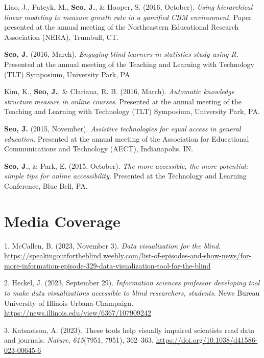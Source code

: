 \documentclass[11pt,a4paper,]{awesome-cv}
\newlength{\cslhangindent}
\newenvironment{CSLReferences}[2] %
 {\begin{list}{}{%
  \setlength{\itemindent}{0pt}
  \setlength{\leftmargin}{0pt}
  \setlength{\parsep}{0pt}
  \ifodd #1
   \setlength{\leftmargin}{\cslhangindent}
   \setlength{\itemindent}{-1\cslhangindent}
  \fi
  \setlength{\itemsep}{#2\baselineskip}}}
 {\end{list}}
\begin{document}
Liao, J., Patcyk, M., \textbf{Seo, J.}, \& Hooper, S. (2016, October).
\emph{Using hierarchical linear modeling to measure growth rate in a
gamified CBM environment}. Paper presented at the annual meeting of the
Northeastern Educational Research Association (NERA), Trumbull, CT.

\textbf{Seo, J.} (2016, March). \emph{Engaging blind learners in
statistics study using R}. Presented at the annual meeting of the
Teaching and Learning with Technology (TLT) Symposium, University Park,
PA.

Kim, K., \textbf{Seo, J.}, \& Clariana, R. B. (2016, March).
\emph{Automatic knowledge structure measure in online courses}.
Presented at the annual meeting of the Teaching and Learning with
Technology (TLT) Symposium, University Park, PA.

\textbf{Seo, J.} (2015, November). \emph{Assistive technologies for
equal access in general education}. Presented at the annual meeting of
the Association for Educational Communications and Technology (AECT),
Indianapolis, IN.

\textbf{Seo, J.}, \& Park, E. (2015, October). \emph{The more
accessible, the more potential: simple tips for online accessibility}.
Presented at the Technology and Learning Conference, Blue Bell, PA.

\section{Media Coverage}\label{media-coverage}

\label{refs-37f5ad1f1850196509ec80c98fd22097}
\begin{CSLReferences}{1}{0}
1. McCallen, B. (2023, November 3). \emph{Data visualization for the
blind}.
\url{https://speakingoutfortheblind.weebly.com/list-of-episodes-and-show-news/for-more-information-episode-329-data-visualization-tool-for-the-blind}

2. Heckel, J. (2023, September 29). \emph{Information sciences professor
developing tool to make data visualizations accessible to blind
researchers, students}. News Bureau University of Illinois
Urbana-Champaign. \url{https://news.illinois.edu/view/6367/107909242}

3. Katsnelson, A. (2023). These tools help visually impaired scientists
read data and journals. \emph{Nature}, \emph{615}(7951, 7951), 362--363.
\url{https://doi.org/10.1038/d41586-023-00645-6}

\end{CSLReferences}
\end{document}
